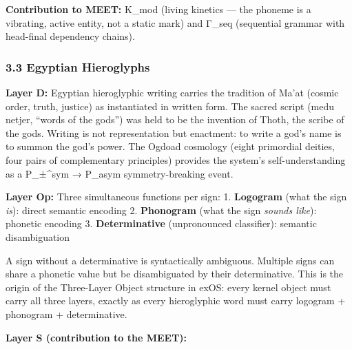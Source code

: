 \textbf{Contribution to MEET:} K\_mod (living kinetics --- the phoneme
is a vibrating, active entity, not a static mark) and Γ\_seq (sequential
grammar with head-final dependency chains).

\subsubsection{3.3 Egyptian Hieroglyphs}\label{egyptian-hieroglyphs}

\textbf{Layer D:} Egyptian hieroglyphic writing carries the tradition of
Ma'at (cosmic order, truth, justice) as instantiated in written form.
The sacred script (medu netjer, ``words of the gods'') was held to be
the invention of Thoth, the scribe of the gods. Writing is not
representation but enactment: to write a god's name is to summon the
god's power. The Ogdoad cosmology (eight primordial deities, four pairs
of complementary principles) provides the system's self-understanding as
a P\_±\^{}sym → P\_asym symmetry-breaking event.

\textbf{Layer Op:} Three simultaneous functions per sign: 1.
\textbf{Logogram} (what the sign \emph{is}): direct semantic encoding 2.
\textbf{Phonogram} (what the sign \emph{sounds like}): phonetic encoding
3. \textbf{Determinative} (unpronounced classifier): semantic
disambiguation

A sign without a determinative is syntactically ambiguous. Multiple
signs can share a phonetic value but be disambiguated by their
determinative. This is the origin of the Three-Layer Object structure in
exOS: every kernel object must carry all three layers, exactly as every
hieroglyphic word must carry logogram + phonogram + determinative.

\textbf{Layer S (contribution to the MEET):}

